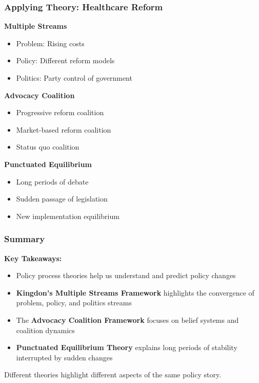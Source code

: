 \documentclass[10pt]{beamer}
\begin{document}
\begin{frame}
\frametitle{Applying Theory: Healthcare Reform}

\textbf{\textcolor{streamblue}{Multiple Streams}}
\begin{itemize}
\item Problem: Rising costs
\item Policy: Different reform models
\item Politics: Party control of government
\end{itemize}

\textbf{\textcolor{coalitionred}{Advocacy Coalition}}
\begin{itemize}
\item Progressive reform coalition
\item Market-based reform coalition
\item Status quo coalition
\end{itemize}

\textbf{\textcolor{punctuationorange}{Punctuated Equilibrium}}
\begin{itemize}
\item Long periods of debate
\item Sudden passage of legislation
\item New implementation equilibrium
\end{itemize}

\end{frame}

\begin{frame}
\frametitle{Summary}

\textbf{Key Takeaways:}
\begin{itemize}
  \item Policy process theories help us understand and predict policy changes
  \item \textbf{Kingdon's Multiple Streams Framework} highlights the convergence of problem, policy, and politics streams
  \item The \textbf{Advocacy Coalition Framework} focuses on belief systems and coalition dynamics
  \item \textbf{Punctuated Equilibrium Theory} explains long periods of stability interrupted by sudden changes
\end{itemize}

\vspace{1cm}

Different theories highlight different aspects of the same policy story.

\end{frame}
\end{document}
